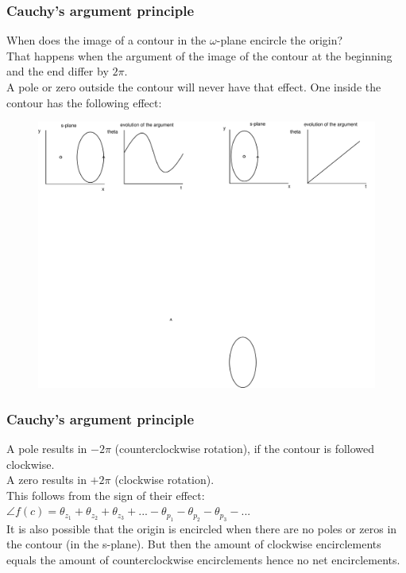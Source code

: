 \begin{frame}
	\frametitle{Cauchy's argument principle}
	When does the image of a contour in the $\omega$-plane encircle the origin?\\
	\medskip
	That happens when the argument of the image of the contour at the beginning and the end differ by $2\pi$.\\
	\medskip
	A pole or zero outside the contour will never have that effect. One inside the contour has the following effect:\\
	\medskip
	\begin{figure}
		\includegraphics[width=1\linewidth]{argument}
	\end{figure}
\end{frame}

\begin{frame}
	\frametitle{Cauchy's argument principle}
	\vspace{-4ex}
	A pole results in $-2\pi$ (counterclockwise rotation), if the contour is followed clockwise.\\
	\medskip
	A zero results in $+2\pi$ (clockwise rotation).\\
	\medskip
	This follows from the sign of their effect: $\angle f(c) = \theta_{z_{1}}+\theta_{z_{2}}+\theta_{z_{3}}+...-\theta_{p_{1}}-\theta_{p_{2}}-\theta_{p_{3}}-...$\\
	\bigskip
	It is also possible that the origin is encircled when there are no poles or zeros in the contour (in the s-plane). But then the amount of clockwise encirclements equals the amount of counterclockwise encirclements hence no net encirclements.
\end{frame}

